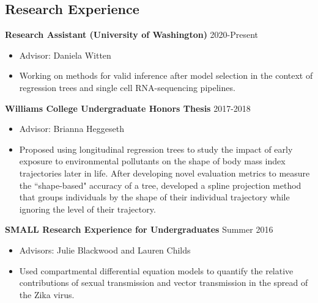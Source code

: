 \documentclass[margin, 10pt]{res} %
\begin{document}
\begin{resume}
 
\section{Research Experience}

{\textbf{Research Assistant (University of Washington)} \hfill 2020-Present
\begin{itemize}
\item Advisor: Daniela Witten
\item Working on methods for valid inference after model selection in the context of regression trees and single cell RNA-sequencing pipelines. 
\end{itemize} 

{\textbf{Williams College Undergraduate Honors Thesis}} \hfill 2017-2018 
\begin{itemize}
\item Advisor: Brianna Heggeseth
\item Proposed using longitudinal regression trees to study the impact of early exposure to environmental pollutants on the shape of body mass index trajectories later in life. After developing novel evaluation metrics to measure the ``shape-based" accuracy of a tree, developed a spline projection method that groups individuals by the shape of their individual trajectory while ignoring the level of their trajectory. 
\end{itemize} 

{\textbf{SMALL Research Experience for Undergraduates}} \hfill Summer 2016 
\begin{itemize}
\item Advisors: Julie Blackwood and Lauren Childs
\item Used compartmental differential equation models to quantify the relative contributions of sexual transmission and vector transmission in the spread of the Zika virus. 
\end{itemize} 


}
\end{resume}
\end{document}
